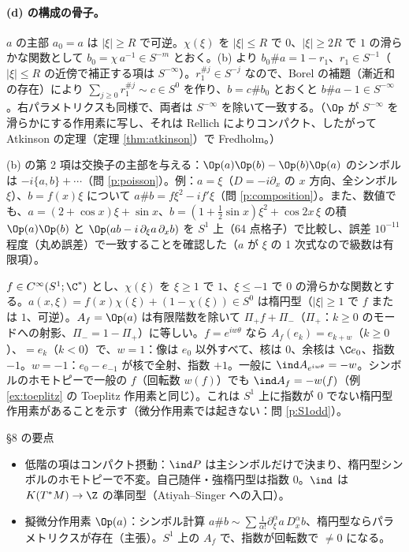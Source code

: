 \paragraph{(d) の構成の骨子。}$a$ の主部 $a_0=a$ は $|\xi|\ge R$ で可逆。$\chi(\xi)$ を $|\xi|\le R$ で $0$、$|\xi|\ge2R$ で $1$ の滑らかな関数として $b_0=\chi\,a^{-1}\in S^{-m}$ とおく。(b) より $b_0\#a=1-r_1$、$r_1\in S^{-1}$（$|\xi|\le R$ の近傍で補正する項は $S^{-\infty}$）。$r_1^{\#j}\in S^{-j}$ なので、Borel の補題（漸近和の存在）により $\sum_{j\ge0}r_1^{\#j}\sim c\in S^0$ を作り、$b=c\#b_0$ とおくと $b\#a-1\in S^{-\infty}$。右パラメトリクスも同様で、両者は $S^{-\infty}$ を除いて一致する。（$\Op$ が $S^{-\infty}$ を滑らかにする作用素に写し、それは Rellich によりコンパクト、したがって Atkinson の定理（定理 \ref{thm:atkinson}）で Fredholm。）
\begin{rem}[微分作用素の場合の確認]
(b) の第 2 項は交換子の主部を与える：$\Op(a)\Op(b)-\Op(b)\Op(a)$ のシンボルは $-i\{a,b\}+\cdots$（問 \ref{p:poisson}）。例：$a=\xi$（$D=-i\partial_x$ の $x$ 方向、全シンボル $\xi$）、$b=f(x)\xi$ について $a\#b=f\xi^2-if'\xi$（問 \ref{p:composition}）。また、数値でも、$a=(2+\cos x)\xi+\sin x$、$b=(1+\frac12\sin x)\xi^2+\cos2x\,\xi$ の積 $\Op(a)\Op(b)$ と $\Op(ab-i\,\partial_\xi a\,\partial_xb)$ を $S^1$ 上（64 点格子）で比較し、誤差 $10^{-11}$ 程度（丸め誤差）で一致することを確認した（$a$ が $\xi$ の 1 次式なので級数は有限項）。
\end{rem}
\begin{ex}\label{ex:A_f}
$f\in C^\infty(S^1;\C^*)$ とし、$\chi(\xi)$ を $\xi\ge1$ で $1$、$\xi\le-1$ で $0$ の滑らかな関数とする。$a(x,\xi)=f(x)\chi(\xi)+(1-\chi(\xi))\in S^0$ は楕円型（$|\xi|\ge1$ で $f$ または $1$、可逆）。$A_f=\Op(a)$ は有限階数を除いて $\Pi_+f+\Pi_-$（$\Pi_+$：$k\ge0$ のモードへの射影、$\Pi_-=1-\Pi_+$）に等しい。$f=e^{iw\theta}$ なら $A_f(e_k)=e_{k+w}$（$k\ge0$）、$=e_k$（$k<0$）で、$w=1$：像は $e_0$ 以外すべて、核は $0$、余核は $\C e_0$、指数 $-1$。$w=-1$：$e_0-e_{-1}$ が核で全射、指数 $+1$。一般に $\ind A_{e^{iw\theta}}=-w$。シンボルのホモトピーで一般の $f$（回転数 $w(f)$）でも $\ind A_f=-w(f)$（例 \ref{ex:toeplitz} の Toeplitz 作用素と同じ）。これは $S^1$ 上に指数が $0$ でない楕円型作用素があることを示す（微分作用素では起きない：問 \ref{p:S1odd}）。
\end{ex}
\begin{keybox}{§8 の要点}
\begin{itemize}
\item 低階の項はコンパクト摂動：$\ind P$ は主シンボルだけで決まり、楕円型シンボルのホモトピーで不変。自己随伴・強楕円型は指数 $0$。$\ind$ は $K(T^*M)\to\Z$ の準同型（Atiyah--Singer への入口）。
\item 擬微分作用素 $\Op(a)$：シンボル計算 $a\#b\sim\sum\frac1{\alpha!}\partial_\xi^\alpha a\,D_x^\alpha b$、楕円型ならパラメトリクスが存在（主張）。$S^1$ 上の $A_f$ で、指数が回転数で $\ne0$ になる。
\end{itemize}
\end{keybox}
